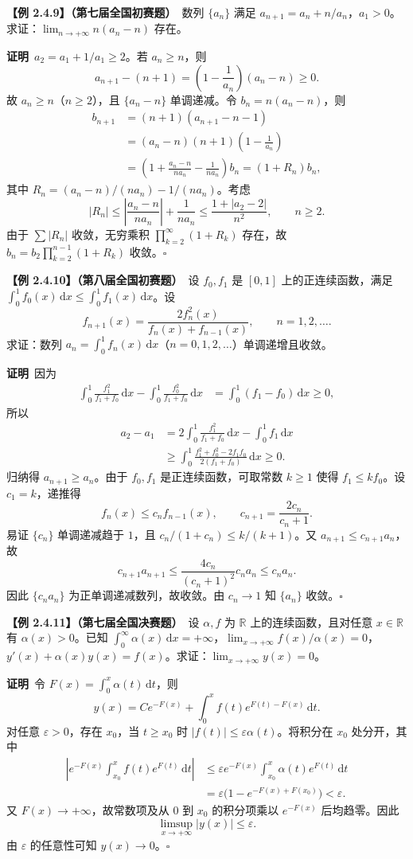 \documentclass[UTF8,a4paper,11pt]{ctexart}
\newcommand{\ex}[2]{\par\medskip\noindent\textbf{【例 #1】（#2）}\ }
\newcommand{\pf}{\par\noindent\textbf{证明}\ }
\begin{document}
\ex{2.4.9}{第七届全国初赛题}数列 $\{a_n\}$ 满足 $a_{n+1}=a_n+n/a_n$，$a_1>0$。求证：$\lim_{n\to+\infty}n(a_n-n)$ 存在。
\pf $a_2=a_1+1/a_1\ge2$。若 $a_n\ge n$，则
\[
a_{n+1}-(n+1)=\left(1-\frac1{a_n}\right)(a_n-n)\ge0.
\]
故 $a_n\ge n$（$n\ge2$），且 $\{a_n-n\}$ 单调递减。令 $b_n=n(a_n-n)$，则
\begin{align*}
b_{n+1}&=(n+1)(a_{n+1}-n-1)\\
&=(a_n-n)(n+1)\left(1-\frac1{a_n}\right)\\
&=\left(1+\frac{a_n-n}{na_n}-\frac1{na_n}\right)b_n
=(1+R_n)b_n,
\end{align*}
其中 $R_n=(a_n-n)/(na_n)-1/(na_n)$。考虑
\[
|R_n|\le\left|\frac{a_n-n}{na_n}\right|+\frac1{na_n}
\le\frac{1+|a_2-2|}{n^2},\qquad n\ge2.
\]
由于 $\sum |R_n|$ 收敛，无穷乘积 $\prod_{k=2}^{\infty}(1+R_k)$ 存在，故 $b_n=b_2\prod_{k=2}^{n-1}(1+R_k)$ 收敛。\hfill$\square$

\ex{2.4.10}{第八届全国初赛题}设 $f_0,f_1$ 是 $[0,1]$ 上的正连续函数，满足 $\int_0^1f_0(x)\,\mathrm dx\le\int_0^1f_1(x)\,\mathrm dx$。设
\[
f_{n+1}(x)=\frac{2f_n^2(x)}{f_n(x)+f_{n-1}(x)},\qquad n=1,2,\ldots.
\]
求证：数列 $a_n=\int_0^1f_n(x)\,\mathrm dx$（$n=0,1,2,\ldots$）单调递增且收敛。
\pf 因为
\begin{align*}
\int_0^1\frac{f_1^2}{f_1+f_0}\,\mathrm dx
-\int_0^1\frac{f_0^2}{f_1+f_0}\,\mathrm dx
&=\int_0^1(f_1-f_0)\,\mathrm dx\ge0,
\end{align*}
所以
\begin{align*}
a_2-a_1
&=2\int_0^1\frac{f_1^2}{f_1+f_0}\,\mathrm dx-\int_0^1f_1\,\mathrm dx\\
&\ge\int_0^1\frac{f_1^2+f_0^2-2f_1f_0}{2(f_1+f_0)}\,\mathrm dx\ge0.
\end{align*}
归纳得 $a_{n+1}\ge a_n$。由于 $f_0,f_1$ 是正连续函数，可取常数 $k\ge1$ 使得 $f_1\le kf_0$。设 $c_1=k$，递推得
\[
f_n(x)\le c_nf_{n-1}(x),\qquad c_{n+1}=\frac{2c_n}{c_n+1}.
\]
易证 $\{c_n\}$ 单调递减趋于 $1$，且 $c_n/(1+c_n)\le k/(k+1)$。又 $a_{n+1}\le c_{n+1}a_n$，故
\[
c_{n+1}a_{n+1}\le\frac{4c_n}{(c_n+1)^2}c_na_n\le c_na_n.
\]
因此 $\{c_na_n\}$ 为正单调递减数列，故收敛。由 $c_n\to1$ 知 $\{a_n\}$ 收敛。\hfill$\square$

\ex{2.4.11}{第七届全国决赛题}设 $\alpha,f$ 为 $\mathbb R$ 上的连续函数，且对任意 $x\in\mathbb R$ 有 $\alpha(x)>0$。已知 $\int_0^\infty\alpha(x)\,\mathrm dx=+\infty$，$\lim_{x\to+\infty}f(x)/\alpha(x)=0$，$y'(x)+\alpha(x)y(x)=f(x)$。求证：$\lim_{x\to+\infty}y(x)=0$。
\pf 令 $F(x)=\int_0^x\alpha(t)\,\mathrm dt$，则
\[
y(x)=Ce^{-F(x)}+\int_0^x f(t)e^{F(t)-F(x)}\,\mathrm dt.
\]
对任意 $\varepsilon>0$，存在 $x_0$，当 $t\ge x_0$ 时 $|f(t)|\le\varepsilon\alpha(t)$。将积分在 $x_0$ 处分开，其中
\begin{align*}
\left|e^{-F(x)}\int_{x_0}^{x}f(t)e^{F(t)}\,\mathrm dt\right|
&\le\varepsilon e^{-F(x)}\int_{x_0}^{x}\alpha(t)e^{F(t)}\,\mathrm dt\\
&=\varepsilon\bigl(1-e^{-F(x)+F(x_0)}\bigr)<\varepsilon.
\end{align*}
又 $F(x)\to+\infty$，故常数项及从 $0$ 到 $x_0$ 的积分项乘以 $e^{-F(x)}$ 后均趋零。因此
\[
\limsup_{x\to+\infty}|y(x)|\le\varepsilon.
\]
由 $\varepsilon$ 的任意性可知 $y(x)\to0$。\hfill$\square$
\end{document}
